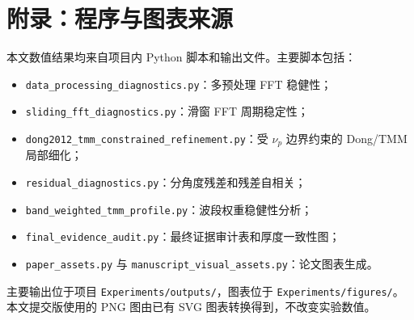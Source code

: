 \documentclass[UTF8,a4paper,12pt]{ctexart}
\begin{document}
\appendix
\section{附录：程序与图表来源}

本文数值结果均来自项目内 Python 脚本和输出文件。主要脚本包括：
\begin{itemize}
  \item \texttt{data\_processing\_diagnostics.py}：多预处理 FFT 稳健性；
  \item \texttt{sliding\_fft\_diagnostics.py}：滑窗 FFT 周期稳定性；
  \item \texttt{dong2012\_tmm\_constrained\_refinement.py}：受 $\nu_p$ 边界约束的 Dong/TMM 局部细化；
  \item \texttt{residual\_diagnostics.py}：分角度残差和残差自相关；
  \item \texttt{band\_weighted\_tmm\_profile.py}：波段权重稳健性分析；
  \item \texttt{final\_evidence\_audit.py}：最终证据审计表和厚度一致性图；
  \item \texttt{paper\_assets.py} 与 \texttt{manuscript\_visual\_assets.py}：论文图表生成。
\end{itemize}

主要输出位于项目 \texttt{Experiments/outputs/}，图表位于 \texttt{Experiments/figures/}。本文提交版使用的 PNG 图由已有 SVG 图表转换得到，不改变实验数值。
\end{document}
